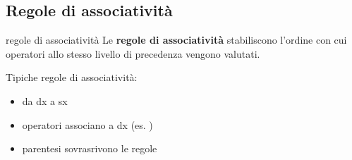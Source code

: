 \subsection{Regole di associatività}
\begin{mydef}{regole di associatività}
    Le \textbf{regole di associatività} stabiliscono l'ordine con cui operatori allo stesso livello di precedenza vengono valutati.
\end{mydef}

Tipiche regole di associatività:
\begin{itemize}[label=$\triangleright$, itemsep=\smallskipamount]
    \item da dx a sx
    \item operatori associano a dx (es. )
    \item parentesi sovrasrivono le regole
\end{itemize}


